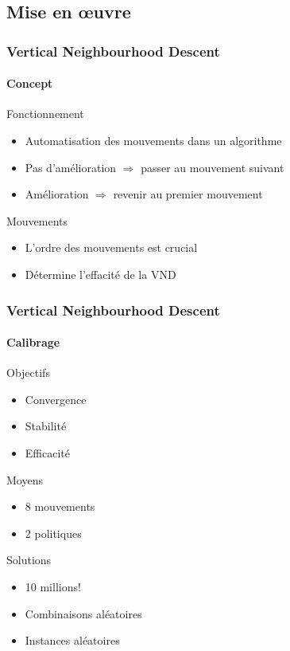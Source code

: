 \subsection{Mise en \oe uvre}
\begin{frame}
	\frametitle{Vertical Neighbourhood Descent}
	\framesubtitle{Concept}
	\begin{block}{Fonctionnement}
		\begin{itemize}
			\item Automatisation des mouvements dans un algorithme
			\item Pas d'amélioration $\Rightarrow$ passer au mouvement suivant
			\item Amélioration $\Rightarrow$ revenir au premier mouvement
		\end{itemize}
	\end{block}
	\vspace*{1em}
	\begin{block}{Mouvements}
		\begin{itemize}
			\item L'ordre des mouvements est crucial
			\item Détermine l'effacité de la VND
		\end{itemize}
	\end{block}
\end{frame}
\begin{frame}
	\frametitle{Vertical Neighbourhood Descent}
	\framesubtitle{Calibrage}
	\begin{alertblock}{Objectifs}
		\begin{itemize}
			\item Convergence
			\item Stabilité
			\item Efficacité
		\end{itemize}
	\end{alertblock}
	\begin{block}{Moyens}
		\begin{itemize}
			\item 8 mouvements
			\item 2 politiques
		\end{itemize}
	\end{block}
	\begin{exampleblock}{Solutions}
		\begin{itemize}
			\item 10 millions!
			\item Combinaisons aléatoires
			\item Instances aléatoires
		\end{itemize}
	\end{exampleblock}
\end{frame}
